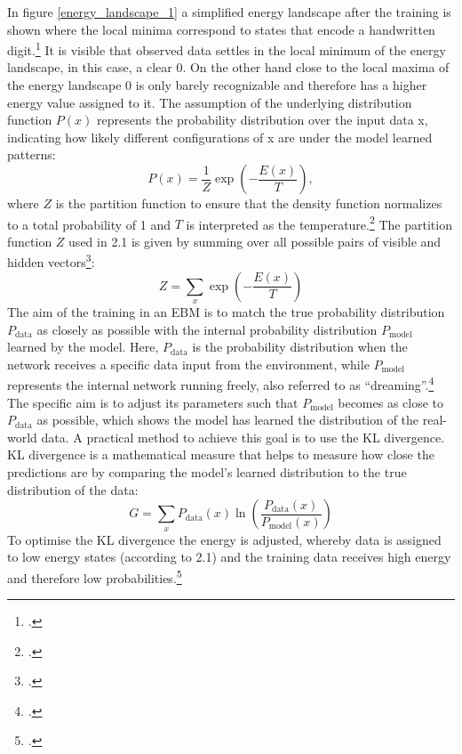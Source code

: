 In figure \ref{energy_landscape_1} a simplified energy landscape after the training is shown where the local minima correspond to states that encode a handwritten digit.\footcite[cf.][6]{huembeliPhysicsEnergybasedModels2022} It is visible that observed data settles in the local minimum of the energy landscape, in this case, a clear 0. On the other hand close to the local maxima of the energy landscape 0 is only barely recognizable and therefore has a higher energy value assigned to it.
The assumption of the underlying distribution function \( P(x) \) represents the probability distribution over the input data x,
indicating how likely different configurations of x are under the model learned patterns:
\begin{equation}
    P(x) = \frac{1}{Z} \exp\left(-\frac{E(x)}{T}\right),
\end{equation}
where \( Z \) is the partition function to ensure
that the density function normalizes to a total probability of 1 and \( T \) is interpreted as the temperature.\footcite[cf.][2-3]{huembeliPhysicsEnergybasedModels2022}
The partition function \( Z \) used in 2.1 is given by summing over all possible pairs of visible and hidden vectors\footcite[cf.][4]{hintonPracticalGuideTraining2012}:
\begin{equation}
    Z = \sum_x \exp\left(-\frac{E(x)}{T}\right)
    \label{partition_function}
\end{equation}
The aim of the training in an \ac{EBM} is to match the true probability distribution \( P_{\text{data}} \) as closely as possible with the internal probability distribution \( P_{\text{model}} \) learned by the model.
Here, \( P_{\text{data}} \) is the probability distribution when the network receives a specific data input from the environment, while \( P_{\text{model}} \) represents the internal network running freely, also referred to as ``dreaming''.\footcite[cf.][154-155]{ackleyLearningAlgorithmBoltzmann1985}
The specific aim is to adjust its parameters such that \( P_{\text{model}} \)
becomes as close to \( P_{\text{data}} \) as possible, which shows the model has learned the distribution of the real-world data.
A practical method to achieve this goal is to use the KL divergence. KL divergence is a mathematical measure that helps to measure how close the predictions are by comparing the model's learned distribution to the true distribution of the data:
\begin{equation}
    G = \sum_x P_{\text{data}}(x) \ln \left( \frac{P_{\text{data}}(x)}{P_{\text{model}}(x)} \right)
\end{equation}
To optimise the KL divergence the energy is adjusted, whereby data is assigned to low energy states (according to 2.1) and the training data receives high energy and therefore low probabilities.\footcite[cf.][2-3]{zhaiDeepStructuredEnergy2016}


